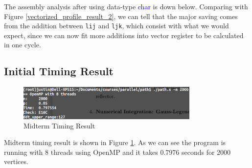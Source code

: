 The assembly analysis after using data-type \textcolor{blue}{char} is down below. Comparing with Figure
\ref{vectorized_profile_result_2}, we can tell that the major saving comes from the addition between 
\texttt{lij} and \texttt{ljk}, which consist with what we would expect, since we can now fit more additions
into vector register to be calculated in one cycle.



\subsection{Initial Timing Result}

\begin{figure}[H]
    \centering
    \includegraphics[width=0.8\textwidth]{figs/2_timing.png}
    \caption{Midterm Timing Result}
    \label{ddt_profile_result_2}
\end{figure}

Midterm timing result is shown in Figure \ref{ddt_profile_result_2}. As we
can see the program is running with 8 threads using OpenMP and it takes 0.7976
seconds for 2000 vertices.

